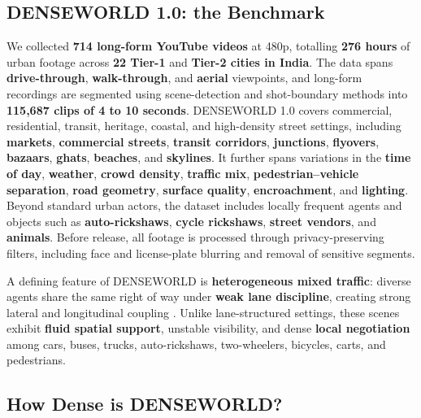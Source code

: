 \subsection{\textbf{DENSEWORLD 1.0}: the Benchmark}
\label{sec:denseworld_dataset}


We collected \textbf{714 long-form YouTube videos} at 480p, totalling
\textbf{276 hours} of urban footage across \textbf{22 Tier-1} and \textbf{Tier-2 cities in India}. The data spans \textbf{drive-through}, \textbf{walk-through}, and \textbf{aerial} viewpoints, and long-form recordings are segmented using scene-detection and shot-boundary methods into \textbf{115,687 clips of 4 to 10 seconds}. DENSEWORLD 1.0 covers commercial, residential, transit, heritage, coastal, and high-density street settings, including \textbf{markets}, \textbf{commercial streets}, \textbf{transit corridors}, \textbf{junctions}, \textbf{flyovers}, \textbf{bazaars}, \textbf{ghats}, \textbf{beaches}, and \textbf{skylines}. It further spans variations in the \textbf{time of day}, \textbf{weather}, \textbf{crowd density}, \textbf{traffic mix}, \textbf{pedestrian--vehicle separation}, \textbf{road geometry}, \textbf{surface quality}, \textbf{encroachment}, and \textbf{lighting}. Beyond standard urban actors, the dataset includes locally frequent agents and objects such as \textbf{auto-rickshaws}, \textbf{cycle rickshaws}, \textbf{street vendors}, and \textbf{animals}. Before release, all footage is processed through privacy-preserving filters, including face and license-plate blurring and removal of sensitive segments.

A defining feature of DENSEWORLD is \textbf{heterogeneous mixed traffic}: diverse agents share the same right of way under \textbf{weak lane discipline}, creating strong lateral and longitudinal coupling \cite{khan1999heterogeneous,papathanasopoulou2018weaklane,asaithambi2012mixedtraffic}. Unlike lane-structured settings, these scenes exhibit \textbf{fluid spatial support}, unstable visibility, and dense \textbf{local negotiation} among cars, buses, trucks, auto-rickshaws, two-wheelers, bicycles, carts, and pedestrians.









\subsection{\textbf{How Dense is DENSEWORLD?}}

